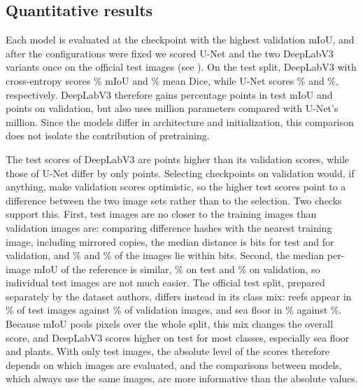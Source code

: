 \subsection{Quantitative results}
\label{sec:quantitative}
Each model is evaluated at the checkpoint with the highest validation mIoU,
and after the configurations were fixed we scored U-Net and the two DeepLabV3
variants once on the \testImages{} official test images
(see ). On the test split, DeepLabV3 with
cross-entropy scores \deeplabCeTestMiou\% mIoU and \deeplabCeTestDice\% mean
Dice, while U-Net scores \unetTestMiou\% and \unetTestDice\%, respectively.
DeepLabV3 therefore gains \deeplabTestGain{} percentage points in test mIoU and
\deeplabGain{} points on validation, but also uses \deeplabMillions{} million
parameters compared with U-Net's \unetMillions{} million. Since the models
differ in architecture and initialization, this comparison does not isolate
the contribution of pretraining.



The test scores of DeepLabV3 are \deeplabCeValTestGap{} points higher than its
validation scores, while those of U-Net differ by only \unetValTestGap{}
points. Selecting checkpoints on validation would, if anything, make validation
scores optimistic, so the higher test scores point to a difference between the
two image sets rather than to the selection. Two checks support this. First,
test images are no closer to the training images than validation images are:
comparing difference hashes with the nearest training image, including mirrored
copies, the median distance is \nearestTestMedian{} bits for test and
\nearestValMedian{} for validation, and \nearestTestClose\% and
\nearestValClose\% of the images lie within \closeBits{} bits. Second, the
median per-image mIoU of the reference is similar, \imageMiouTestMedian\% on
test and \imageMiouValMedian\% on validation, so individual test images are not
much easier. The official test split, prepared separately by the dataset
authors, differs instead in its class mix: reefs appear in
\suimPresenceTestRI\% of test images against \suimPresenceValRI\% of validation
images, and sea floor in \suimPresenceTestSR\% against \suimPresenceValSR\%.
Because mIoU pools pixels over the whole split, this mix changes the overall
score, and DeepLabV3 scores higher on test for most classes, especially sea
floor and plants. With only \testImages{} test images, the absolute level of the scores
therefore depends on which images are evaluated, and the comparisons between
models, which always use the same images, are more informative than the
absolute values.

